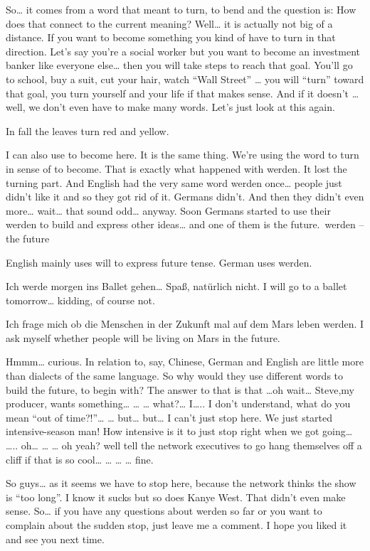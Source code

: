 \documentclass[a4paper,12pt]{article}
\begin{document}
\begin{adjustwidth}{2em}{0pt}
\begin{adjustwidth}{3em}{0pt}
So… it comes from a word that meant to turn, to bend and the question is: How does that connect to the current meaning? Well…  it is actually not big of a distance. If you want to become something you kind of have to turn in that direction. Let’s say you’re a social worker but you want to become an investment banker like everyone else… then you will take steps to reach that goal. You’ll go to school, buy a suit, cut your hair, watch “Wall Street” … you will “turn” toward that goal, you turn yourself and your life if that makes sense. And if it doesn’t … well, we don’t even have to make many words. Let’s just look at this again.

    In fall the leaves turn red and yellow.

I can also use to become here. It is the same thing. We’re using the word to turn in sense of to become. That is exactly what happened with werden. It lost the turning part. And English had the very same word werden once… people just didn’t like it and so they got rid of it.
Germans didn’t. And then they didn’t even more… wait… that sound odd… anyway.
Soon Germans started to use their werden to build and express other ideas… and
one of them is the future.\
werden – the future


English mainly uses will to express future tense. German uses werden.

    Ich werde morgen ins Ballet gehen… Spaß, natürlich nicht.
    I will go to a ballet tomorrow… kidding, of course not.

    Ich frage mich ob die Menschen in der Zukunft mal auf dem Mars leben werden.
    I ask myself whether people will be living on Mars in the future.

Hmmm… curious. In relation to, say, Chinese, German and English are little more than dialects of the same language. So why would they use different words to build the future, to begin with? The answer to that is that …oh wait… Steve,my producer, wants something… … … what?… I….. I don’t understand, what do you mean “out of time?!”…  … but… but… I can’t just stop here. We just started intensive-season man! How intensive is it to just stop right when we got going… ….. oh… … … oh yeah? well tell the network executives to go hang themselves off a cliff if that is so cool… … … … fine.

So guys… as it seems we have to stop here, because the network thinks the show is “too long”. I know it sucks but so does Kanye West.
That didn’t even make sense.
So… if you have any questions about werden so far or you want to complain about the sudden stop, just leave me a comment. I hope you liked it and see you next time.


\end{adjustwidth}
\end{adjustwidth}
\end{document}
